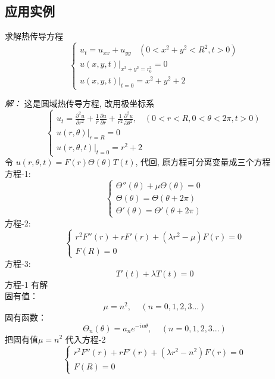 \subsection{应用实例}
\begin{example}
	求解热传导方程
	\begin{equation*}
		\begin{cases}
		u_t= u_{xx}   +u_{yy} ~~~~ (0< x^2 +y^2 <R ^2, t>0)\\
		u(x,y,t)|_{x^2+y^2=r_0 ^2}= 0 \\
		u(x,y,t)|_{t=0}= x^2+y^2 +2
	\end{cases} 
    \end{equation*}
\end{example}
\emph{解：}
	这是圆域热传导方程, 改用极坐标系
	$$\begin{cases}
		\displaystyle	u_t= {	\frac{\partial^2 u }{\partial r^2 } +\frac{1}{r } \frac{\partial u }{\partial r } +
		\frac{1}{r^2 } \frac{\partial ^2 u }{\partial \theta ^2
		} }, ~~~~ (0<r<R, 0<\theta<2\pi, t>0)\\
		u(r,\theta)|_{r=R}=0 	\\
		u(r,\theta,t)|_{t=0} =r^2 +2 	
	\end{cases} $$
	令 $u(r,\theta,t) =F(r)\Theta(\theta)T(t)$, 代回, 原方程可分离变量成三个方程 \\
	方程-1: $$ \begin{cases}
		\Theta ''(\theta)+\mu \Theta (\theta) =0 \\
		\Theta (\theta) =	\Theta (\theta+2\pi)  \\
		\Theta' (\theta) =	\Theta' (\theta+2\pi)  
	\end{cases} $$
	方程-2:	$$ \begin{cases}
		r^2 F'' (r)+r F'(r) +( \lambda r^2 -\mu)F(r)=0  \\
		F(R)=0
	\end{cases} $$
	方程-3: \begin{equation*}
		T'(t)+\lambda T(t)=0 
	\end{equation*}	
	方程-1 有解 \\
	固有值：
	\begin{equation*}
		\mu=n^2, ~~~~~(n=0,1,2,3...)
	\end{equation*}
	固有函数：
	\begin{equation*}
		\Theta_n(\theta) = a_n e^{-i n \theta}, ~~~~~(n=0,1,2,3...)
	\end{equation*}
	把固有值$ \mu = n^2 $ 代入方程-2
	$$ \begin{cases}
		r^2 F'' (r)+r F'(r) +( \lambda r^2 -n^2)F(r)=0  \\
		F(R)=0
	\end{cases} $$
